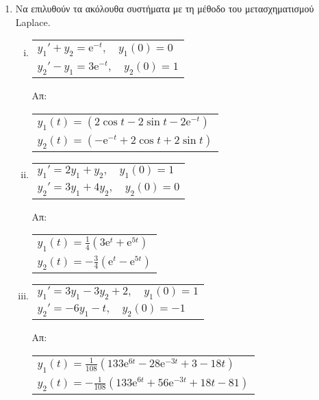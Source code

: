 \begin{enumerate}
  \item Να επιλυθούν τα ακόλουθα συστήματα με τη μέθοδο του μετασχηματισμού Laplace.
    \begin{enumerate}[i)]
      \item \begin{tabular}{l}
          $ y_{1}'+ y_{2} = \mathrm{e}^{-t}, \quad y_{1}(0)=0 $ \\
          $ y_{2}' - y_{1} =3\mathrm{e}^{-t}, \quad y_{2}(0)=1 $
      \end{tabular} \hfill Απ: 
      \begin{tabular}{l}
        $ y_{1}(t) = (2 \cos{t} - 2 \sin{t} -2 \mathrm{e}^{-t}) $ \\
        $ y_{2}(t) = ( - \mathrm{e}^{-t} + 2 \cos{t} + 2 \sin{t}) $
      \end{tabular}
    \item \begin{tabular}{l}
        $ y_{1}'=2 y_{1}+ y_{2}, \quad y_{1}(0)=1 $ \\
        $ y_{2}'= 3 y_{1}+ 4 y_{2}, \quad y_{2}(0)= 0 $ 
    \end{tabular} \hfill Απ: 
    \begin{tabular}{l}
      $ y_{1}(t) = \frac{1}{4} \left(3 \mathrm{e}^{t} + \mathrm{e}^{5t}\right) $ \\
      $ y_{2}(t) = -\frac{3}{4} \left( \mathrm{e}^{t} -  \mathrm{e}^{5t}\right) $ 
    \end{tabular}
      \item \begin{tabular}{l}
          $ y_{1}' = 3 y_{1}- 3 y_{2}+2, \quad y_{1}(0)=1 $ \\
          $ y_{2}' = -6 y_{1} - t, \quad y_{2}(0)=-1 $
      \end{tabular}\hfill \hfill Απ: 
      \begin{tabular}{l}
        $y_{1}(t)=\frac{1}{108}\left(133 \mathrm{e}^{6t} - 28 \mathrm{e}^{-3t} + 3 -18t
        \right)$ \\
        $y_{2}(t)=-\frac{1}{108}\left(133 \mathrm{e}^{6t} + 56 \mathrm{e}^{-3t} + 18t -81
        \right)$ 
      \end{tabular} 
    \end{enumerate}


\end{enumerate}
